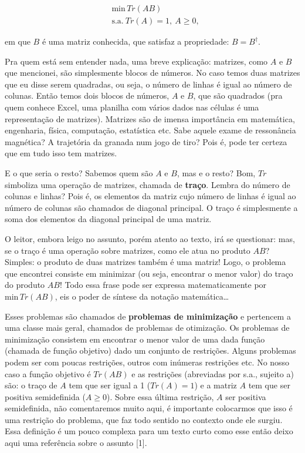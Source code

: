 \documentclass[11pt]{article}
\begin{document}
\begin{align} &\text{min}\, Tr(AB) \\ &\text{s.a.}\ Tr(A) = 1,\ A \geq 0,  \label{eq1} \tag{1}
	\end{align} 

em que \(B\) é uma matriz conhecida, que satisfaz a propriedade: \(B = B^{\dagger}\).

Pra quem está sem entender nada, uma breve explicação: matrizes, como
\(A\) e \(B\) que mencionei, são simplesmente blocos de números. No caso
temos duas matrizes que eu disse serem quadradas, ou seja, o número de
linhas é igual ao número de colunas. Então temos dois blocos de números,
\(A\) e \(B\), que são quadrados (pra quem conhece Excel, uma planilha
com vários dados nas células é uma representação de matrizes). Matrizes
são de imensa importância em matemática, engenharia, física, computação,
estatística etc. Sabe aquele exame de ressonância magnética? A
trajetória da granada num jogo de tiro? Pois é, pode ter certeza que em
tudo isso tem matrizes.

E o que seria o resto? Sabemos quem são \(A\) e \(B\), mas e o resto?
Bom, \(Tr\) simboliza uma operação de matrizes, chamada de
\textbf{traço}. Lembra do número de colunas e linhas? Pois é, os
elementos da matriz cujo número de linhas é igual ao número de colunas
são chamados de diagonal principal. O traço é simplesmente a soma dos
elementos da diagonal principal de uma matriz.

O leitor, embora leigo no assunto, porém atento ao texto, irá se
questionar: mas, se o traço é uma operação sobre matrizes, como ele atua
no produto \(AB\)? Simples: o produto de duas matrizes também é uma
matriz! Logo, o problema que encontrei consiste em minimizar (ou seja,
encontrar o menor valor) do traço do produto \(AB\)! Todo essa frase
pode ser expressa matematicamente por \(\text{min}\, Tr(AB)\), eis o
poder de síntese da notação matemática\ldots{}

Esses problemas são chamados de \textbf{problemas de minimização} e
pertencem a uma classe mais geral, chamados de problemas de otimização.
Os problemas de minimização consistem em encontrar o menor valor de uma
dada função (chamada de função objetivo) dado um conjunto de restrições.
Alguns problemas podem ser com poucas restrições, outros com inúmeras
restrições etc. No nosso caso a função objetivo é \(Tr(AB)\) e as
restrições (abreviadas por s.a., sujeito a) são: o traço de \(A\) tem
que ser igual a 1 (\(Tr(A) = 1\)) e a matriz \(A\) tem que ser positiva
semidefinida (\(A \geq 0\)). Sobre essa última restrição, \(A\) ser
positiva semidefinida, não comentaremos muito aqui, é importante
colocarmos que isso é uma restrição do problema, que faz todo sentido no
contexto onde ele surgiu. Essa definição é um pouco complexa para um
texto curto como esse então deixo aqui uma referência sobre o assunto
{[}1{]}.
\end{document}
